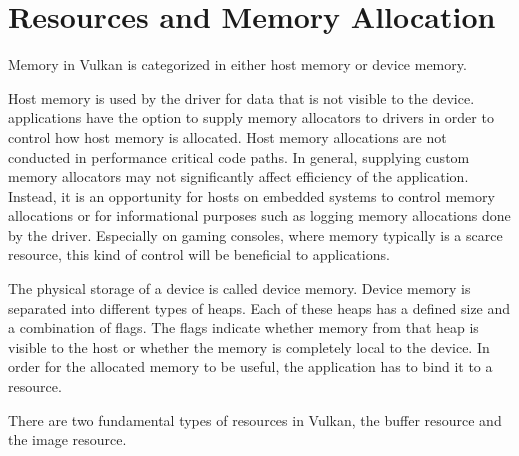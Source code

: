   \section{Resources and Memory Allocation}
  \label{sec:MemoryManagement}
    Memory in Vulkan is categorized in either \gls{host} memory or \gls{device} memory.

    Host memory is used by the \gls{driver} for data that is not visible to the device.
    \glspl{application} have the option to supply memory allocators to \glspl{driver} in order to control how \gls{host} memory is allocated.
    Host memory allocations are not conducted in performance critical code paths.
    In general, supplying custom memory allocators may not significantly affect efficiency of the \gls{application}.
    Instead, it is an opportunity for \glspl{host} on embedded systems to control memory allocations or for informational purposes such as logging memory allocations done by the \gls{driver}.
    Especially on gaming consoles, where memory typically is a scarce resource, this kind of control will be beneficial to applications.

    The physical storage of a device is called device memory. Device memory is separated into different types of heaps. Each of these heaps has a defined size and a combination of flags. The flags indicate whether memory from that heap is visible to the \gls{host} or whether the memory is completely local to the device. In order for the allocated memory to be useful, the \gls{application} has to bind it to a resource.

    There are two fundamental types of resources in Vulkan, the buffer resource and the image resource.

